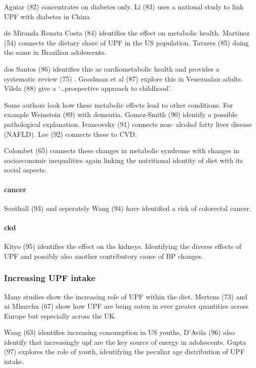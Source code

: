 \documentclass[
]{article}
\begin{document}
Aguiar (82) concentrates on diabetes only. Li (83) uses a national study
to link UPF with diabetes in China.

de Miranda Renata Costa (84) identifies the effect on metabolic health.
Martinez (54) connects the dietary share of UPF in the US population.
Tavares (85) doing the same in Brazilian adolescents.

dos Santos (86) identifies this as cardiometabolic health and provides a
systematic review (75) . Goodman et al (87) explore this in Venezualan
adults. Vilela (88) give a `\ldots prospective approach to childhood'.

Some authors look how these metabolic effects lead to other conditions.
For example Weinstein (89) with dementia. Gomez-Smith (90) identify a
possible pathological explanation. Ivancovsky (91) connects non- alcohol
fatty liver disease (NAFLD). Lee (92) connects these to CVD.

Colombet (65) connects these changes in metabolic syndrome with changes
in socioeconomic inequalities again linking the nutritional identity of
diet with its social aspects.

\hypertarget{cancer}{%
\paragraph{cancer}\label{cancer}}

Southall (93) and seperately Wang (94) have identified a risk of
colorectal cancer.

\hypertarget{ckd}{%
\paragraph{ckd}\label{ckd}}

Kityo (95) identifies the effect on the kidneys. Identifying the diverse
effects of UPF and possibly also another contributory cause of BP
changes.

\hypertarget{increasing-upf-intake}{%
\subsubsection{Increasing UPF intake}\label{increasing-upf-intake}}

Many studies show the increasing role of UPF within the diet. Mertens
(73) and ni Mhurchu (67) show how UPF are being eaten in ever greater
quantities across Europe but especially across the UK.

Wang (63) identifies increasing consumption in US youths, D'Avila (96)
also identify that increasingly upf are the key source of energy in
adolescents. Gupta (97) explores the role of youth, identifying the
peculiar age distribution of UPF intake.
\end{document}
